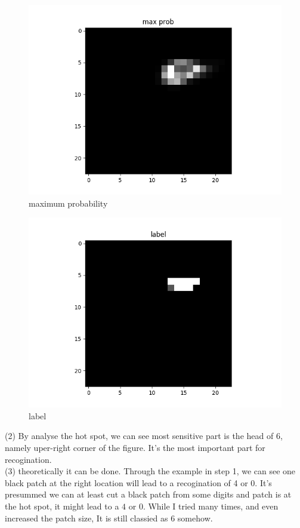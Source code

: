 \documentclass[12pt]{article}
\begin{document}
\begin{figure}[h]
    \centering
    \includegraphics [scale=0.35]{digit6_max_prob.png}
    \caption {maximum probability}
\end{figure}

\begin{figure}[h]
    \centering
    \includegraphics [scale=0.35]{digit6_label.png}
    \caption {label}
\end{figure}
\clearpage
(2) By analyse the hot spot, we can see most sensitive part is the
head of $6$, namely uper\--right corner of the figure. It's the most
important part for recogination.\\
(3) theoretically it can be done. Through the example in step 1, we
can see one black patch at the right location will lead to a
recogination of 4 or 0. It's presummed we can at least cut a black
patch from some digits and patch is at the hot spot, it might lead to
a $4$ or $0$. While I tried many times, and even increased the patch
size, It is still classied as $6$ somehow.
\end{document}
